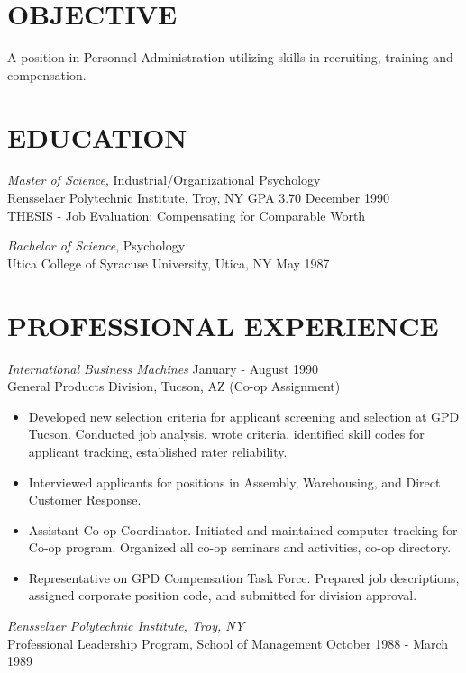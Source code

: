 \documentclass{res}
\begin{document}
\begin{resume}
 
\section{OBJECTIVE}
\vspace{8pt} %
A  position  in  Personnel  Administration  utilizing  skills  in 
recruiting, training and compensation. 
 
\vspace{0.2in}
\section{EDUCATION} 
\vspace{8pt} 
{\sl Master of Science}, Industrial/Organizational Psychology \\
Rensselaer Polytechnic Institute, Troy, NY \hspace{0.2in}  GPA 3.70 \hfill December 1990 \\
THESIS - Job Evaluation: Compensating for Comparable Worth
 
{\sl Bachelor of Science}, Psychology \\ %
Utica College of Syracuse University, Utica, NY      \hfill    May 1987
  
\vspace{0.2in} 
\section{PROFESSIONAL EXPERIENCE} 
\vspace{8pt}
{\sl International Business Machines} \hfill        January - August 1990 \\
General Products Division, Tucson, AZ       \hfill   (Co-op Assignment)
  
   \begin{itemize} \itemsep -2pt %
   \item Developed  new selection criteria for applicant screening and 
    selection  at  GPD  Tucson.  Conducted  job  analysis,  wrote 
    criteria,  identified  skill  codes  for  applicant tracking, 
    established rater reliability. 
   \item Interviewed   applicants   for   positions    in    Assembly, 
    Warehousing, and Direct Customer Response. 
  \item Assistant   Co-op   Coordinator.   Initiated  and  maintained 
    computer tracking for  Co-op  program.  Organized  all  co-op 
    seminars and activities, co-op directory. 
   \item Representative  on  GPD Compensation Task Force. Prepared job 
    descriptions, assigned corporate position code, and submitted 
    for division approval. 
 \end{itemize}
{\sl Rensselaer Polytechnic Institute, Troy, NY} \\[2pt]
Professional Leadership Program, School of Management \hfill    October 
 1988 - March 1989 


\end{resume}
\end{document}
